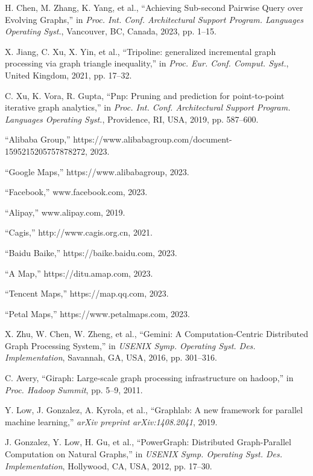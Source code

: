 \documentclass[lettersize,journal]{IEEEtran}
\begin{document}
\begin{thebibliography}{100}


H. Chen, M. Zhang, K. Yang, et al., ``Achieving Sub-second Pairwise Query over Evolving Graphs,'' in \textit{Proc. Int. Conf. Architectural Support Program. Languages Operating Syst.}, Vancouver, BC, Canada, 2023, pp. 1--15.

X. Jiang, C. Xu, X. Yin, et al., ``Tripoline: generalized incremental graph processing via graph triangle inequality,'' in \textit{Proc. Eur. Conf. Comput. Syst.}, United Kingdom, 2021, pp. 17--32.

C. Xu, K. Vora, R. Gupta, ``Pnp: Pruning and prediction for point-to-point iterative graph analytics,'' in \textit{Proc. Int. Conf. Architectural Support Program. Languages Operating Syst.}, Providence, RI, USA, 2019, pp. 587--600.

``Alibaba Group,'' https://www.alibabagroup.com/document-1595215205757878272, 2023.


``Google Maps,'' https://www.alibabagroup, 2023.

``Facebook,'' www.facebook.com, 2023.

``Alipay,'' www.alipay.com, 2019.

``Cagis,'' http://www.cagis.org.cn, 2021.

``Baidu Baike,'' https://baike.baidu.com, 2023.

``A Map,'' https://ditu.amap.com, 2023.

``Tencent Maps,'' https://map.qq.com, 2023.

``Petal Maps,'' https://www.petalmaps.com, 2023.

X. Zhu, W. Chen, W. Zheng, et al., ``Gemini: A {Computation-Centric} Distributed Graph Processing System,'' in \textit{USENIX Symp. Operating Syst. Des. Implementation}, Savannah, GA, USA, 2016, pp. 301--316.

C. Avery, ``Giraph: Large-scale graph processing infrastructure on hadoop,'' in \textit{Proc. Hadoop Summit}, pp. 5--9, 2011.

Y. Low, J. Gonzalez, A. Kyrola, et al., ``Graphlab: A new framework for parallel machine learning,'' \textit{arXiv preprint arXiv:1408.2041}, 2019.

J. Gonzalez, Y. Low, H. Gu, et al., ``{PowerGraph}: Distributed {Graph-Parallel} Computation on Natural Graphs,'' in \textit{USENIX Symp. Operating Syst. Des. Implementation}, Hollywood, CA, USA, 2012, pp. 17--30.


\end{thebibliography}
\end{document}
